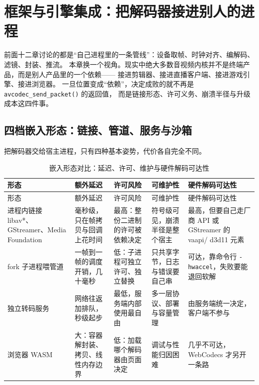 \documentclass[12pt,a4paper,fontset=fandol]{ctexbook}
\newcommand{\Fn}[1]{\texttt{#1()}}
\newcommand{\Tp}[1]{\texttt{#1}}
\newcommand{\Bk}{\discretionary{}{}{}}
\begin{document}
\chapter{框架与引擎集成：把解码器接进别人的进程}
\label{ch:ch13-framework-integration}

前面十二章讨论的都是``自己进程里的一条管线''：设备取帧、时钟对齐、编解码、滤镜、封装、推流。
本章换一个视角。现实中绝大多数音视频内核并不是终端产品，而是别人产品里的一个依赖——
接进剪辑器、接进直播客户端、接进游戏引擎、接进浏览器。
一旦位置变成``依赖''，决定成败的就不再是 \Fn{avcodec\_{\Bk}send\_{\Bk}packet} 的返回值，
而是链接形态、许可义务、崩溃半径与升级成本这四件事。

\section{四档嵌入形态：链接、管道、服务与沙箱}

把解码器交给宿主进程，只有四种基本姿势，代价各自完全不同。

\begin{longtable}{>{\raggedright\arraybackslash}p{}
                  >{\raggedright\arraybackslash}p{}
                  >{\raggedright\arraybackslash}p{}
                  >{\raggedright\arraybackslash}p{}
                  >{\raggedright\arraybackslash}p{}}
\caption{嵌入形态对比：延迟、许可、维护与硬件解码可达性}\label{tab:ch13-embed-forms} \\
\toprule
形态 & 额外延迟 & 许可风险 & 可维护性 & 硬件解码可达性 \\
\midrule
\endfirsthead
\toprule
形态 & 额外延迟 & 许可风险 & 可维护性 & 硬件解码可达性 \\
\midrule
\endhead
\midrule
\endfoot
\bottomrule
\endlastfoot
进程内链接 \Bk libav*、\Bk GStreamer、\Bk Media Foundation &
毫秒级，只在帧拷贝与回调上花时间 &
最高：整份二进制的许可被依赖决定 &
符号级可见，崩溃半径是整个宿主 &
最高，但要自己走厂商 API 或 \Bk GStreamer 的 vaapi\Bk/ d3d11 元素 \\
fork 子进程喂管道 &
一帧到一帧的调度开销，几十毫秒 &
低：子进程可独立许可、独立替换 &
只共享字节，日志与错误要自己串 &
可达，靠命令行 \Tp{-{\Bk}hwaccel}，失败要能退回软解 \\
独立转码服务 &
网络往返加排队，秒级起步 &
最低，服务端内部使用最自由 &
多一层协议、部署与容量管理 &
由服务端统一决定，客户端不参与 \\
浏览器 WASM &
大：容器解封装、拷贝、线性内存边界 &
低：加载哪个解码器由页面决定 &
调试与性能归因困难 &
几乎不可达，WebCodecs 才另开一条路 \\
\end{longtable}
\end{document}
